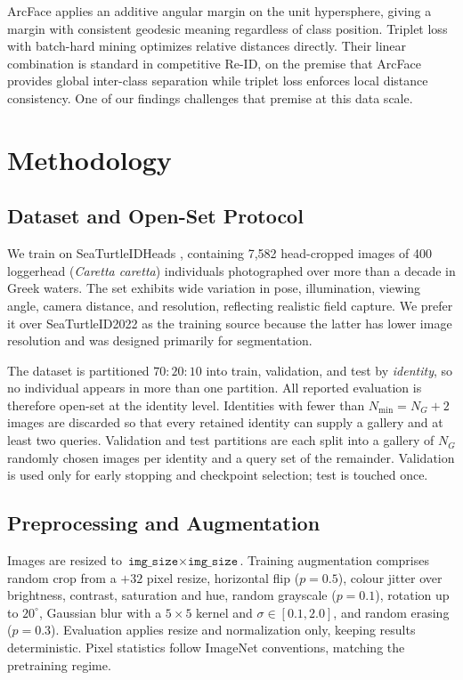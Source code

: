 \documentclass[conference]{IEEEtran}
\begin{document}
ArcFace \cite{deng2019} applies an additive angular margin on the unit hypersphere,
giving a margin with consistent geodesic meaning regardless of class position. Triplet
loss \cite{schroff2015} with batch-hard mining \cite{hermans2017} optimizes relative
distances directly. Their linear combination is standard in competitive Re-ID, on the
premise that ArcFace provides global inter-class separation while triplet loss enforces
local distance consistency. One of our findings challenges that premise at this data
scale.

\section{Methodology}

\subsection{Dataset and Open-Set Protocol}

We train on SeaTurtleIDHeads \cite{stidheads}, containing 7{,}582 head-cropped images
of 400 loggerhead (\textit{Caretta caretta}) individuals photographed over more than a
decade in Greek waters. The set exhibits wide variation in pose, illumination, viewing
angle, camera distance, and resolution, reflecting realistic field capture. We prefer
it over SeaTurtleID2022 as the training source because the latter has lower image
resolution and was designed primarily for segmentation.

The dataset is partitioned $70{:}20{:}10$ into train, validation, and test by
\emph{identity}, so no individual appears in more than one partition. All reported
evaluation is therefore open-set at the identity level. Identities with fewer than
$N_{\min} = N_G + 2$ images are discarded so that every retained identity can supply a
gallery and at least two queries. Validation and test partitions are each split into a
gallery of $N_G$ randomly chosen images per identity and a query set of the remainder.
Validation is used only for early stopping and checkpoint selection; test is touched
once.

\subsection{Preprocessing and Augmentation}

Images are resized to $\texttt{img\_size} \times \texttt{img\_size}$. Training
augmentation comprises random crop from a $+32$ pixel resize, horizontal flip
($p=0.5$), colour jitter over brightness, contrast, saturation and hue, random
grayscale ($p=0.1$), rotation up to $20^\circ$, Gaussian blur with a $5\times5$ kernel
and $\sigma \in [0.1, 2.0]$, and random erasing ($p=0.3$). Evaluation applies resize and
normalization only, keeping results deterministic. Pixel statistics follow ImageNet
conventions, matching the pretraining regime.
\end{document}
